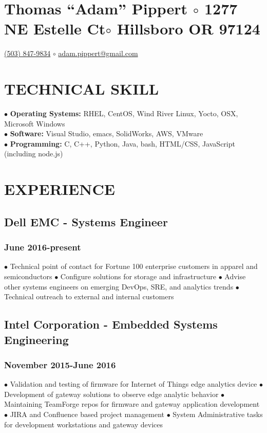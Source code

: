 \documentclass{article}
\begin{document}
\section*{Thomas ``Adam'' Pippert $\circ$
1277 NE Estelle Ct$\circ$
Hillsboro OR 97124}
\href{tel:+15038479834}{(503) 847-9834} $\circ$
\href{mailto:adam.pippert@gmail.com}{adam.pippert@gmail.com}

\section*{TECHNICAL SKILL}


$\bullet$ \textbf{Operating Systems:} RHEL, CentOS, Wind River Linux, Yocto, OSX, Microsoft Windows\\
$\bullet$ \textbf{Software:} Visual Studio, emacs, SolidWorks, AWS, VMware\\
$\bullet$ \textbf{Programming:} C, C++, Python, Java, bash, HTML/CSS, JavaScript (including node.js)\\


\section*{EXPERIENCE}

\subsection*{Dell EMC - Systems Engineer}
\subsubsection*{June 2016-present}

$\bullet$ Technical point of contact for Fortune 100 enterprise customers in apparel and semiconductors
$\bullet$ Configure solutions for storage and infrastructure
$\bullet$ Advise other systems engineers on emerging DevOps, SRE, and analytics trends
$\bullet$ Technical outreach to external and internal customers

\subsection*{Intel Corporation - Embedded Systems Engineering}
\subsubsection*{November 2015-June 2016}

$\bullet$ Validation and testing of firmware for Internet of Things edge analytics device
$\bullet$ Development of gateway solutions to observe edge analytic behavior
$\bullet$ Maintaining TeamForge repos for firmware and gateway application development
$\bullet$ JIRA and Confluence based project management
$\bullet$ System Administrative tasks for development workstations and gateway devices
\end{document}
